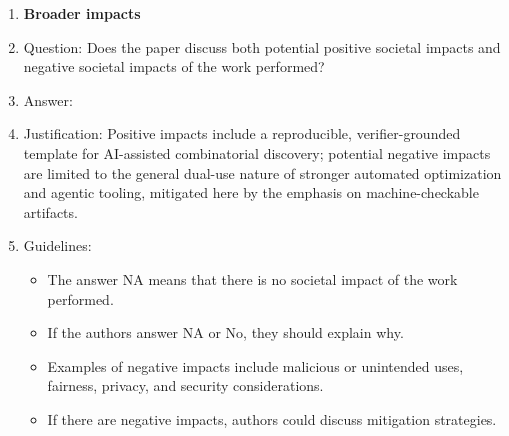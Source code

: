 \documentclass{article}
\begin{document}
\begin{enumerate}
\item {\bf Broader impacts}
    \item[] Question: Does the paper discuss both potential positive societal impacts and negative societal impacts of the work performed?
    \item[] Answer: \answerYes{}
    \item[] Justification: Positive impacts include a reproducible, verifier-grounded template for AI-assisted combinatorial discovery; potential negative impacts are limited to the general dual-use nature of stronger automated optimization and agentic tooling, mitigated here by the emphasis on machine-checkable artifacts.
    \item[] Guidelines:
    \begin{itemize}
        \item The answer NA means that there is no societal impact of the work performed.
        \item If the authors answer NA or No, they should explain why.
        \item Examples of negative impacts include malicious or unintended uses, fairness, privacy, and security considerations.
        \item If there are negative impacts, authors could discuss mitigation strategies.
    \end{itemize}

\end{enumerate}
\end{document}
